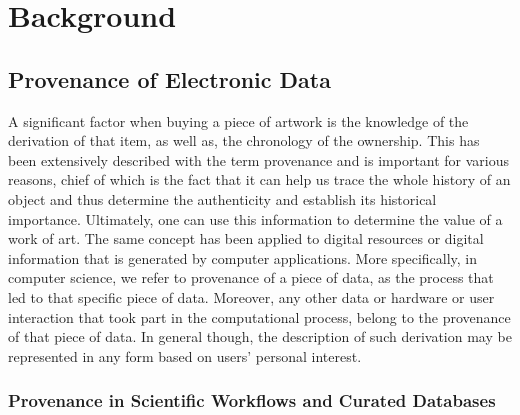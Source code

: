 
\chapter{Background} %
\label{Background}


\section{Provenance of Electronic Data}

A significant factor when buying a piece of artwork is the knowledge of the derivation of that item, as well as, the chronology of the ownership. This has been extensively described with the term provenance and is important for various reasons, chief of which is the fact that it can help us trace the whole history of an object and thus determine the authenticity and establish its historical importance.  Ultimately, one can use this information to determine the value of a work of art.
The same concept has been applied to digital resources or digital information that is generated by computer applications\cite{reference5}. More specifically, in computer science, we refer to provenance of a piece of data, as the process that led to that specific piece of data\cite{reference1}. Moreover, any other data or hardware or user interaction that took part in the computational process, belong to the provenance of that piece of data. In general though, the description of such derivation may be represented in any form based on users' personal interest\cite{reference9}.

\subsection{Provenance in Scientific Workflows and Curated Databases}

